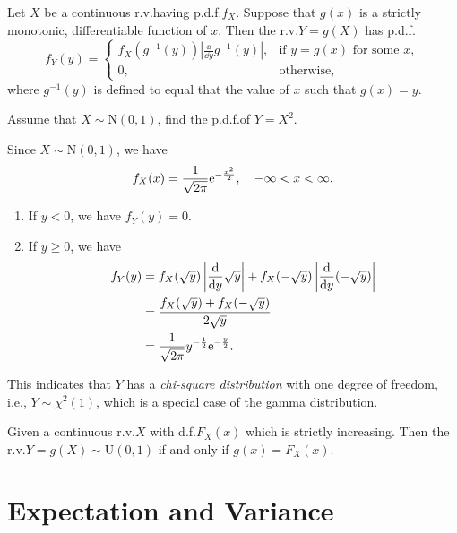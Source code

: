\begin{theorem}
  Let \(X\) be a continuous r.v.\@ having p.d.f.\@ \(f_X\). Suppose that \(g(x)\) is a strictly monotonic, differentiable function of \(x\). Then the r.v.\@ \(Y = g(X)\) has p.d.f.\@
  \[
    f_Y(y) = \begin{cases}
      f_X(g^{-1}(y)) \left|\frac{\dd}{\dd y} g^{-1}(y)\right|, & \text{if } y = g(x) \text{ for some } x, \\
      0, & \text{otherwise},
    \end{cases}
  \]
  where \(g^{-1}(y)\) is defined to equal that the value of \(x\) such that \(g(x) = y\).
\end{theorem}

\begin{example}
  Assume that \(X \sim \mathrm{N}(0, 1)\), find the p.d.f.\@ of \(Y = X^2\).
\end{example}
\begin{solution}
  Since \(X \sim \mathrm{N}(0, 1)\), we have
  \[
    f_X(x) = \frac{1}{\sqrt{2\mathrm{\pi}}} \mathrm{e}^{-\frac{x^2}{2}}, \quad -\infty < x < \infty.
  \]
  \begin{enumerate}
    \item If \(y < 0\), we have \(f_Y(y) = 0\).
    \item If \(y \geq 0\), we have
    \begin{align*}
      f_Y(y) & = f_X(\sqrt{y}) \left|\frac{\mathrm{d}}{\mathrm{d} y} \sqrt{y}\right| + f_X(-\sqrt{y}) \left|\frac{\mathrm{d}}{\mathrm{d} y} (-\sqrt{y})\right| \\
      & = \frac{f_X(\sqrt{y}) + f_X(-\sqrt{y})}{2\sqrt{y}} \\
      & = \frac{1}{\sqrt{2 \mathrm{\pi}}} y^{-\frac{1}{2}} \mathrm{e}^{-\frac{y}{2}}.
    \end{align*}
  \end{enumerate}
  This indicates that \(Y\) has a \emph{chi-square distribution} with one degree of freedom, i.e., \(Y \sim \chi^2(1)\), which is a special case of the gamma distribution.
\end{solution}

\begin{proposition}
  Given a continuous r.v.\@ \(X\) with d.f.\@ \(F_X(x)\) which is strictly increasing. Then the r.v.\@ \(Y = g(X) \sim \mathrm{U}(0, 1)\) if and only if \(g(x) = F_X(x)\).
\end{proposition}

\section{Expectation and Variance}

